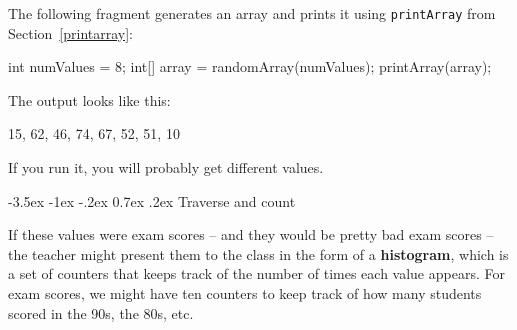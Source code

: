 \documentclass[12pt]{book}
\makeatletter
\theoremstyle{exercise}
\newcommand{\java}[1]{\verb"#1"}
\renewcommand{\section}{\@startsection{section}{1}{\z@}%
    {-3.5ex \@plus -1ex \@minus -.2ex}%
    {0.7ex \@plus.2ex}%
    {\normalfont\Large\bfseries}}
\newcommand{\java}[1]{\lstinline{#1}} %
\makeatother
\begin{document}
The following fragment generates an array and prints it using \java{printArray} from Section~\ref{printarray}:

\begin{code}
    int numValues = 8;
    int[] array = randomArray(numValues);
    printArray(array);
\end{code}

The output looks like this:

\begin{stdout}
{15, 62, 46, 74, 67, 52, 51, 10}
\end{stdout}

If you run it, you will probably get different values.


\section{Traverse and count}


If these values were exam scores -- and they would be pretty bad exam scores -- the teacher might present them to the class in the form of a {\bf histogram}, which is a set of counters that keeps track of the number of times each value appears.
For exam scores, we might have ten counters to keep track of how many students scored in the 90s, the 80s, etc.





\end{document}
